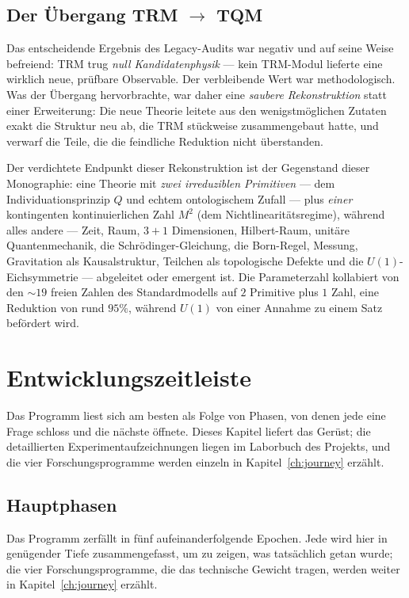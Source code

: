 \documentclass[10pt,twoside,openany]{book}
\begin{document}
\section{Der Übergang TRM $\to$ TQM}

Das entscheidende Ergebnis des Legacy-Audits war negativ und auf seine Weise befreiend: TRM
trug \emph{null Kandidatenphysik} --- kein TRM-Modul lieferte eine wirklich neue, prüfbare
Observable. Der verbleibende Wert war methodologisch. Was der Übergang hervorbrachte, war
daher eine \emph{saubere Rekonstruktion} statt einer Erweiterung: Die neue Theorie leitete
aus den wenigstmöglichen Zutaten exakt die Struktur neu ab, die TRM stückweise
zusammengebaut hatte, und verwarf die Teile, die die feindliche Reduktion nicht überstanden.

Der verdichtete Endpunkt dieser Rekonstruktion ist der Gegenstand dieser Monographie: eine
Theorie mit \emph{zwei irreduziblen Primitiven} --- dem Individuationsprinzip $Q$ und echtem
ontologischem Zufall --- plus \emph{einer} kontingenten kontinuierlichen Zahl $M^2$ (dem
Nichtlinearitätsregime), während alles andere --- Zeit, Raum, $3{+}1$ Dimensionen,
Hilbert-Raum, unitäre Quantenmechanik, die Schr\"odinger-Gleichung, die Born-Regel, Messung,
Gravitation als Kausalstruktur, Teilchen als topologische Defekte und die
$U(1)$-Eichsymmetrie --- abgeleitet oder emergent ist. Die Parameterzahl kollabiert von den
$\sim19$ freien Zahlen des Standardmodells auf $2$ Primitive plus $1$ Zahl, eine Reduktion
von rund $95\%$, während $U(1)$ von einer Annahme zu einem Satz befördert wird.

\chapter{Entwicklungszeitleiste}
\label{ch:timeline}

Das Programm liest sich am besten als Folge von Phasen, von denen jede eine Frage schloss
und die nächste öffnete. Dieses Kapitel liefert das Gerüst; die detaillierten
Experimentaufzeichnungen liegen im Laborbuch des Projekts, und die vier
Forschungsprogramme werden einzeln in Kapitel~\ref{ch:journey} erzählt.

\section{Hauptphasen}

Das Programm zerfällt in fünf aufeinanderfolgende Epochen. Jede wird hier in genügender
Tiefe zusammengefasst, um zu zeigen, was tatsächlich getan wurde; die vier
Forschungsprogramme, die das technische Gewicht tragen, werden weiter in
Kapitel~\ref{ch:journey} erzählt.
\end{document}
